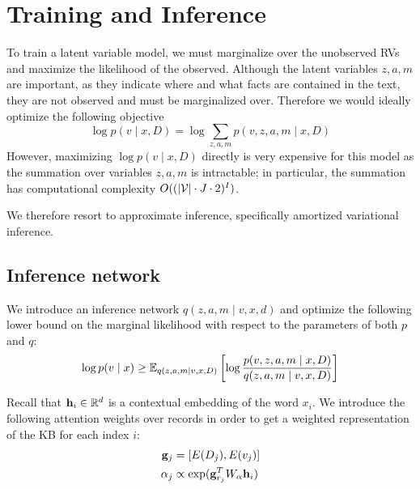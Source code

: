 \documentclass[12pt]{article}
\begin{document}
\section{Training and Inference}
To train a latent variable model, we must marginalize over the unobserved RVs
and maximize the likelihood of the observed.
Although the latent variables $z,a,m$ are important, as they indicate
where and what facts are contained in the text, they are not observed
and must be marginalized over.
Therefore we would ideally optimize the following objective
\begin{equation}
\log p(v \mid x,D) = \log \sum_{z,a,m} p(v,z,a,m \mid x,D)
\end{equation}
However, maximizing $\log p(v \mid x,D)$ directly is very expensive for this model
as the summation over variables $z,a,m$ is intractable;
in particular,
the summation has computational complexity $O((|\mathcal{V}|\cdot J\cdot 2)^{I})$.

We therefore resort to approximate inference,
specifically amortized variational inference.

\subsection{Inference network}
We introduce an inference network $q(z,a,m\mid v,x,d)$
and optimize the following lower bound on the marginal likelihood
with respect to the parameters of both $p$ and $q$:
\begin{equation}
\label{eqn:lowerbound}
\log p(v\mid x) \geq
\mathbb{E}_{q(z,a,m\mid v,x,D)}\left[\log \frac{p(v,z,a,m\mid x,D)}{q(z,a,m\mid v,x,D)}\right]
\end{equation}

Recall that $\mathbf{h}_i \in \mathbb{R}^d$ is a contextual embedding of the word $x_i$.
We introduce the following attention weights over records
in order to get a weighted representation
of the KB for each index $i$:
\begin{align}
\mathbf{g}_j &= [E(D_j), E(v_j)]\\
\alpha_j &\propto \exp(\mathbf{g}_{r_j}^T W_\alpha \mathbf{h}_i)
\end{align}
\end{document}
